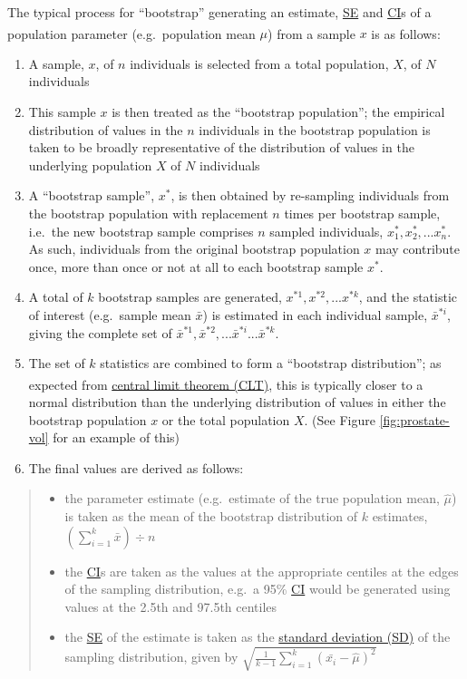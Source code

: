 \documentclass[
]{article}
\providecommand{\tightlist}{%
  \setlength{\itemsep}{0pt}\setlength{\parskip}{0pt}}
\begin{document}
The typical process for ``bootstrap'' generating an estimate, \hyperref[acronyms_SE]{SE} and \hyperref[acronyms_CI]{CI}s of a population parameter (e.g.~population mean \(\mu\)) from a sample \(x\) is as follows\textsuperscript{}:

\begin{enumerate}
\def\labelenumi{\arabic{enumi}.}
\tightlist
\item
  A sample, \(x\), of \(n\) individuals is selected from a total population, \(X\), of \(N\) individuals
\item
  This sample \(x\) is then treated as the ``bootstrap population''; the empirical distribution of values in the \(n\) individuals in the bootstrap population is taken to be broadly representative of the distribution of values in the underlying population \(X\) of \(N\) individuals
\item
  A ``bootstrap sample'', \(x^*\), is then obtained by re-sampling individuals from the bootstrap population with replacement \(n\) times per bootstrap sample, i.e.~the new bootstrap sample comprises \(n\) sampled individuals, \(x^*_1, x^*_2,...x^*_n\). As such, individuals from the original bootstrap population \(x\) may contribute once, more than once or not at all to each bootstrap sample \(x^*\).
\item
  A total of \(k\) bootstrap samples are generated, \(x^{*1}, x^{*2},...x^{*k}\), and the statistic of interest (e.g.~sample mean \(\bar{x}\)) is estimated in each individual sample, \(\bar{x}^{*i}\), giving the complete set of \(\bar{x}^{*1}, \bar{x}^{*2},...\bar{x}^{*i}...\bar{x}^{*k}\).
\item
  The set of \(k\) statistics are combined to form a ``bootstrap distribution''; as expected from \hyperref[acronyms_CLT]{central limit theorem (CLT)}\textsuperscript{}, this is typically closer to a normal distribution than the underlying distribution of values in either the bootstrap population \(x\) or the total population \(X\). (See Figure \ref{fig:prostate-vol} for an example of this)
\item
  The final values are derived as follows:
\end{enumerate}

\begin{quote}
\begin{itemize}
\tightlist
\item
  the parameter estimate (e.g.~estimate of the true population mean, \(\hat{\mu}\)) is taken as the mean of the bootstrap distribution of \(k\) estimates, \((\sum^k_{i = 1} \bar{x}) \div n\)
\item
  the \hyperref[acronyms_CI]{CI}s are taken as the values at the appropriate centiles at the edges of the sampling distribution, e.g.~a 95\% \hyperref[acronyms_CI]{CI} would be generated using values at the 2.5th and 97.5th centiles
\item
  the \hyperref[acronyms_SE]{SE} of the estimate is taken as the \hyperref[acronyms_SD]{standard deviation (SD)} of the sampling distribution, given by \(\sqrt{\frac{1}{k - 1} \sum^k_{i = 1} (\bar{x_i} - \hat{\mu})^2}\)
\end{itemize}
\end{quote}
\end{document}
